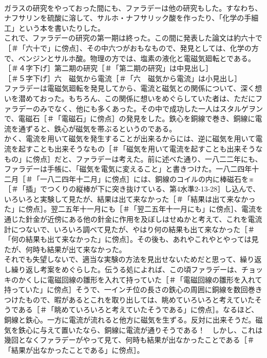 \documentclass[8pt]{extreport}
\begin{document}
\begin{CJK}{UTF8}{min}
\\	ガラスの研究をやっておった間にも、ファラデーは他の研究もした。すなわち、ナフサリンを硫酸に溶して、サルホ・ナフサリック酸を作ったり、「化学の手細工」という本を書いたりした。
\\	これで、ファラデーの研究の第一期は終った。この間に発表した論文は約六十で［＃「六十で」に傍点］、その中六つがおもなもので、発見としては、化学の方で、ベンジンとサルホ酸。物理の方では、塩素の液化と電磁気廻転とである。
\\	［＃４字下げ］第二期の研究［＃「第二期の研究」は中見出し］
\\	［＃５字下げ］六　磁気から電流［＃「六　磁気から電流」は小見出し］
\\	ファラデーは電磁気廻転を発見してから、電流と磁気との関係について、深く想いを潜めておった。もちろん、この関係に想いをめぐらしていた者は、ただにファラデーのみでなく、他にも多くあった。その中で成功した一人はスタルゲヲンで、電磁石［＃「電磁石」に傍点］の発見をした。鉄心を銅線で巻き、銅線に電流を通ずると、鉄心が磁気を帯ぶるというのである。
\\	かく、電流を用いて磁気を発生することが出来るからには、逆に磁気を用いて電流を起すことも出来そうなもの［＃「磁気を用いて電流を起すことも出来そうなもの」に傍点］だと、ファラデーは考えた。前に述べた通り、一八二二年にも、ファラデーは手帳に、「磁気を電気に変えること」と書きつけた。一八二四年十二月［＃「一八二四年十二月」に傍点］には、銅線のコイルの内に棒磁石を※［＃「插」でつくりの縦棒が下に突き抜けている、第4水準2-13-28］し込んで、いろいろと実験して見たが、結果は出て来なかった［＃「結果は出て来なかった」に傍点］。翌二五年十一月にも［＃「翌二五年十一月にも」に傍点］、電流を通じた針金が近傍にある他の針金に作用を及ぼしはせぬかと考えて、これを電流計につないで、いろいろ調べて見たが、やはり何の結果も出て来なかった［＃「何の結果も出て来なかった」に傍点］。その後も、あれやこれやとやっては見たが、何時も結果が出て来なかった。
\\	それでも失望しないで、適当な実験の方法を見出せないためだと思って、繰り返し繰り返し考案をめぐらした。伝うる処によれば、この頃ファラデーは、チョッキのかくしに電磁回線の雛形を入れて持っていた［＃「電磁回線の雛形を入れて持っていた」に傍点］そうで、一インチ位の長さの鉄心の周囲に銅線を数回巻きつけたもので、暇があるとこれを取り出しては、眺めていろいろと考えていたそうである［＃「眺めていろいろと考えていたそうである」に傍点］。なるほど、銅線と鉄心。一方に電流が流れると他方に磁気を生ずる。反対に出来そうだ。磁気を鉄心に与えて置いたなら、銅線に電流が通りそうである！　しかし、これは幾回となくファラデーがやって見て、何時も結果が出なかったことである［＃「結果が出なかったことである」に傍点］。

\end{CJK}
\end{document}
